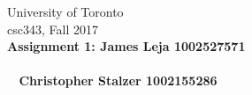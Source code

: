 \documentclass{article}
\newcommand{\var}[1]{\mathit{#1}}
\begin{document}
\noindent
University of Toronto\\
{\sc csc}343, Fall 2017\\[10pt]
{\LARGE\bf Assignment 1: James Leja 1002527571 \\\\\
\hspace*{4.3cm} Christopher Stalzer 1002155286} \\[10pt]

%
%
%
\end{document}
